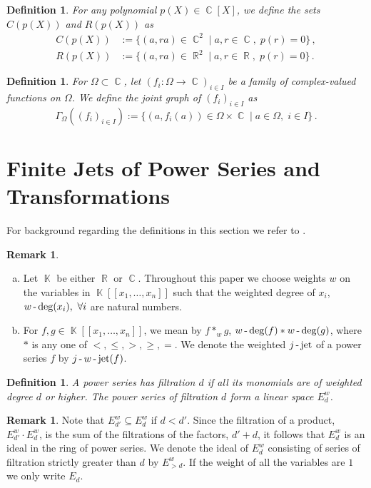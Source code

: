 \documentclass[noend]{amsproc}
\newtheorem{defn}[theorem]{Definition}
\theoremstyle{definition}
\newtheorem{remark}[theorem]{Remark}
\DeclareMathOperator{\R}{\mathbb{R}}
\DeclareMathOperator{\C}{\mathbb{C}}
\DeclareMathOperator{\K}{\mathbb{K}}
\DeclareMathOperator{\dash}{\textnormal{-}}
\DeclareMathOperator{\jet}{jet}
\begin{document}
\begin{defn}
For any polynomial $p(X) \in \C[X]$, we define the sets $C(p(X))$ and $R(p(X))$
as
\begin{align*}
C(p(X)) &:= \{ (a, ra) \in \C^2 \mid a, r \in \C, \; p(r) = 0 \} \,, \\
R(p(X)) &:= \{ (a, ra) \in \R^2 \mid a, r \in \R, \; p(r) = 0 \} \,.
\end{align*}
\end{defn}

\begin{defn}
For $\Omega \subset \C$, let $(f_i: \Omega \rightarrow \C)_{i \in I}$ be a
family of complex-valued functions on $\Omega$. We define the joint graph of
$(f_i)_{i \in I}$ as
\[
\Gamma_\Omega((f_i)_{i \in I})
:= \{ (a, f_i(a)) \in \Omega \times \C \mid a\in \Omega,\; i \in I \}\,.
\]
\end{defn}


\section{Finite Jets of Power Series and Transformations}

For background regarding the definitions in this section we refer to \cite{A1975}.

\begin{remark}
\phantom{X}\hfill
\begin{enumerate}[(a)]
\item Let $\K$ be either $\R$ or $\C$. Throughout this paper we choose weights $w$ on the variables in $\K[[x_1,\ldots,x_n]]$ such that the weighted degree of $x_i$, $w\dash\deg(x_i),\ \forall i$ are natural numbers. 
\item For $f,g\in\K[[x_1,\ldots,x_n]]$, we mean by $f*_wg$, $w\dash\deg(f)* w\dash\deg(g)$, where $*$ is any one of $<,\le,>,\ge,=$. We denote the weighted $j\dash\jet$ of a power series $f$ by $j\dash w\dash\jet(f)$.
\end{enumerate}
\end{remark}

\begin{defn}
A power series has filtration $d$ if all its monomials are of weighted degree $d$ or higher. The power series of filtration $d$ form a linear space $E_d^w$.
\end{defn}

\begin{remark}
Note that $E_{d'}^w\subseteq E_d^w$ if $d<d'$. Since the filtration of a product, $E_{d'}^w\cdot E_d^w$, is the sum of the filtrations of the factors, $d'+d$, it follows that $E_d^w$ is an ideal in the ring of power series. We denote the ideal of $E_d^w$ consisting of series of filtration strictly greater than $d$ by $E_{>d}^w$. If the weight of all the variables are $1$ we only write $E_d$. 
\end{remark}
\end{document}
